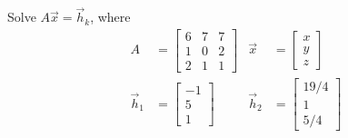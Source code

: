 \begin{Exercise}
Solve $A\vec{x} = \vec{h}_k$, where
\begin{align*}
A &=
\begin{bmatrix}
6 & 7 & 7\\
1 & 0 & 2\\
2 & 1 & 1
\end{bmatrix}
&\vec{x} &=
\begin{bmatrix}
x\\
y\\
z
\end{bmatrix} \\
\vec{h}_1 &=
\begin{bmatrix}
-1 \\
5 \\
1
\end{bmatrix}
& \vec{h}_2 &=
\begin{bmatrix}
19/4 \\
1 \\
5/4
\end{bmatrix}
\end{align*}
\end{Exercise}
